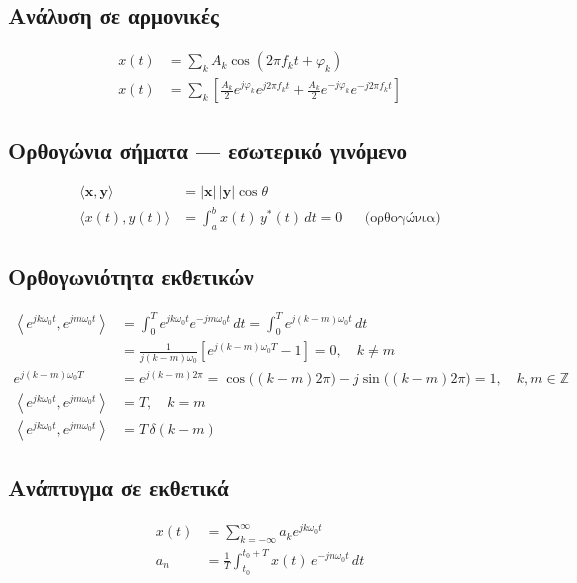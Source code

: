 \documentclass[11pt,a4paper]{article}
\begin{document}
\subsection{Ανάλυση σε αρμονικές}
\begin{align}
x(t) &= \sum_k A_k \cos(2\pi f_k t + \varphi_k) \\
x(t) &= \sum_k \left[\frac{A_k}{2}e^{j\varphi_k}e^{j2\pi f_k t} + \frac{A_k}{2}e^{-j\varphi_k}e^{-j2\pi f_k t}\right]
\end{align}

\subsection{Ορθογώνια σήματα — εσωτερικό γινόμενο}
\begin{align}
\langle \bm{x}, \bm{y} \rangle &= |\bm{x}|\,|\bm{y}|\cos\theta \\
\langle x(t), y(t) \rangle &= \int_a^b x(t)\,y^*(t)\,dt = 0 && \text{(ορθογώνια)}
\end{align}

\subsection{Ορθογωνιότητα εκθετικών}
\begin{align}
\left\langle e^{jk\omega_0 t}, e^{jm\omega_0 t} \right\rangle
&= \int_0^T e^{jk\omega_0 t} e^{-jm\omega_0 t}\,dt
 = \int_0^T e^{j(k-m)\omega_0 t}\,dt \\
&= \frac{1}{j(k-m)\omega_0}\left[e^{j(k-m)\omega_0 T} - 1\right] = 0, \quad k \neq m \\
e^{j(k-m)\omega_0 T} &= e^{j(k-m)2\pi} = \cos\bigl((k-m)2\pi\bigr) - j\sin\bigl((k-m)2\pi\bigr) = 1, \quad k,m \in \mathbb{Z} \\
\left\langle e^{jk\omega_0 t}, e^{jm\omega_0 t} \right\rangle &= T, \quad k = m \\
\left\langle e^{jk\omega_0 t}, e^{jm\omega_0 t} \right\rangle &= T\,\delta(k-m)
\end{align}

\subsection{Ανάπτυγμα σε εκθετικά}
\begin{align}
x(t) &= \sum_{k=-\infty}^{\infty} a_k e^{jk\omega_0 t} \\
a_n &= \frac{1}{T}\int_{t_0}^{t_0+T} x(t)\,e^{-jn\omega_0 t}\,dt
\end{align}
\end{document}
